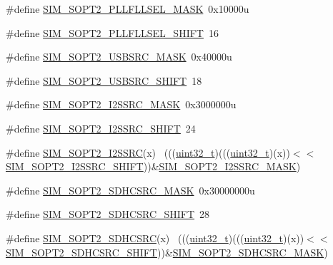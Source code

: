 \begin{DoxyCompactItemize}
\item 
\#define \hyperlink{group___s_i_m___register___masks_gaa14141a225f9778babacbf3b90d0bae2}{S\+I\+M\+\_\+\+S\+O\+P\+T2\+\_\+\+P\+L\+L\+F\+L\+L\+S\+E\+L\+\_\+\+M\+A\+SK}~0x10000u
\item 
\#define \hyperlink{group___s_i_m___register___masks_gae98b4d574b65472bdb294092d4ce5b4a}{S\+I\+M\+\_\+\+S\+O\+P\+T2\+\_\+\+P\+L\+L\+F\+L\+L\+S\+E\+L\+\_\+\+S\+H\+I\+FT}~16
\item 
\#define \hyperlink{group___s_i_m___register___masks_ga1caf7ffe2555eb59ed410110b6aba463}{S\+I\+M\+\_\+\+S\+O\+P\+T2\+\_\+\+U\+S\+B\+S\+R\+C\+\_\+\+M\+A\+SK}~0x40000u
\item 
\#define \hyperlink{group___s_i_m___register___masks_ga2a455b7e86f26185c92961e139d13a89}{S\+I\+M\+\_\+\+S\+O\+P\+T2\+\_\+\+U\+S\+B\+S\+R\+C\+\_\+\+S\+H\+I\+FT}~18
\item 
\#define \hyperlink{group___s_i_m___register___masks_ga2fdeae5216958746b1a1675b809aac96}{S\+I\+M\+\_\+\+S\+O\+P\+T2\+\_\+\+I2\+S\+S\+R\+C\+\_\+\+M\+A\+SK}~0x3000000u
\item 
\#define \hyperlink{group___s_i_m___register___masks_gaa4e02f6001e7223b4ca32a9567d0af81}{S\+I\+M\+\_\+\+S\+O\+P\+T2\+\_\+\+I2\+S\+S\+R\+C\+\_\+\+S\+H\+I\+FT}~24
\item 
\#define \hyperlink{group___s_i_m___register___masks_ga9d708c7b7012fead441c8e82ff835c9f}{S\+I\+M\+\_\+\+S\+O\+P\+T2\+\_\+\+I2\+S\+S\+RC}(x)                                        ~(((\hyperlink{_p_e___types_8h_a33594304e786b158f3fb30289278f5af}{uint32\+\_\+t})(((\hyperlink{_p_e___types_8h_a33594304e786b158f3fb30289278f5af}{uint32\+\_\+t})(x))$<$$<$\hyperlink{group___s_i_m___register___masks_gaa4e02f6001e7223b4ca32a9567d0af81}{S\+I\+M\+\_\+\+S\+O\+P\+T2\+\_\+\+I2\+S\+S\+R\+C\+\_\+\+S\+H\+I\+FT}))\&\hyperlink{group___s_i_m___register___masks_ga2fdeae5216958746b1a1675b809aac96}{S\+I\+M\+\_\+\+S\+O\+P\+T2\+\_\+\+I2\+S\+S\+R\+C\+\_\+\+M\+A\+SK})
\item 
\#define \hyperlink{group___s_i_m___register___masks_gadfe4a9ff5d8ba836d827d0d265dc3055}{S\+I\+M\+\_\+\+S\+O\+P\+T2\+\_\+\+S\+D\+H\+C\+S\+R\+C\+\_\+\+M\+A\+SK}~0x30000000u
\item 
\#define \hyperlink{group___s_i_m___register___masks_gac0d4558ce58c6d9bf19af4f36c363562}{S\+I\+M\+\_\+\+S\+O\+P\+T2\+\_\+\+S\+D\+H\+C\+S\+R\+C\+\_\+\+S\+H\+I\+FT}~28
\item 
\#define \hyperlink{group___s_i_m___register___masks_ga28b80836c7612cd8497fe86936ef0653}{S\+I\+M\+\_\+\+S\+O\+P\+T2\+\_\+\+S\+D\+H\+C\+S\+RC}(x)                                      ~(((\hyperlink{_p_e___types_8h_a33594304e786b158f3fb30289278f5af}{uint32\+\_\+t})(((\hyperlink{_p_e___types_8h_a33594304e786b158f3fb30289278f5af}{uint32\+\_\+t})(x))$<$$<$\hyperlink{group___s_i_m___register___masks_gac0d4558ce58c6d9bf19af4f36c363562}{S\+I\+M\+\_\+\+S\+O\+P\+T2\+\_\+\+S\+D\+H\+C\+S\+R\+C\+\_\+\+S\+H\+I\+FT}))\&\hyperlink{group___s_i_m___register___masks_gadfe4a9ff5d8ba836d827d0d265dc3055}{S\+I\+M\+\_\+\+S\+O\+P\+T2\+\_\+\+S\+D\+H\+C\+S\+R\+C\+\_\+\+M\+A\+SK})

\end{DoxyCompactItemize}

